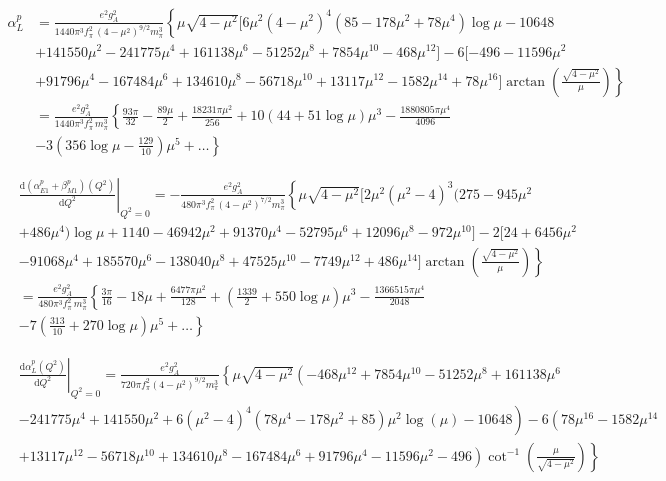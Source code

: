 \documentclass[11pt,preprint,tightenlines,
showpacs,preprintnumbers,amsmath,amssymb,superscriptaddress,a4paper,nofootinbib]{revtex4-1}
\def\dd{\mathrm{d}}
\begin{document}
\begin{align}
\alpha_{L}^p &= \frac{e^2 g_A^2}{1440 \pi^3 f_\pi^2\,  (4-\mu^2)^{9/2} m_\pi^3}\left\{   \mu  \sqrt{4-\mu^2} [ 6 \mu^2 (4-\mu^2)^4 (85 - 178 \mu^2 + 78 \mu^4) \log\mu -10648  \nonumber \right.\\
&+ 141550 \mu^2- 241775 \mu^4 + 161138 \mu^6 -51252 \mu^8 + 7854 \mu^{10} -468 \mu^{12}  ]  - 6 [-496 - 11596  \mu^2  \nonumber \\
&\left.+ 91796 \mu^4 -167484 \mu^6 + 134610 \mu^8 - 56718 \mu^{10} + 13117 \mu^{12} - 1582 \mu^{14} + 78 \mu^{16}] \arctan\left( \frac{\sqrt{4-\mu^2}}{\mu}\right) \right\}\nonumber\\
&= \frac{e^2 g_A^2}{1440 \pi^3 f_\pi^2\,  m_\pi^3}\left\{ \frac{93 \pi}{32} - \frac{89 \mu}{2} + \frac{18231 \pi \mu^2}{256} +10 (44+ 51 \log\mu )\mu^3 -\frac{1880805 \pi \mu^4}{4096} \right.\nonumber \\
&\left. - 3\left(356 \log\mu -\frac{129}{10}\right)\mu^5 +\dots  \right\}
\end{align}


\begin{align}
&\left.\frac{\dd(\alpha_{E1}^p+\beta_{M1}^p) (Q^2)}{\dd Q^2}\right|_{Q^2=0}=-\frac{e^2 g_A^2}{480 \pi^3 f_\pi^2\,  (4-\mu^2)^{7/2} m_\pi^3}\left\{ \mu\sqrt{4-\mu^2} [2\mu^2 (\mu^2-4)^3 (275-945 \mu^2  \right. \nonumber \\
&+486 \mu^4) \log\mu + 1140-46942 \mu^2 + 91370 \mu^4-52795 \mu^6 +12096 \mu^8 -972 \mu^{10} ]  -2 [24 +6456\mu^2 \nonumber\\
&\left. -91068 \mu^4 +185570 \mu^6 - 138040 \mu^8 +47525\mu^{10} -7749\mu^{12} +486 \mu^{14}] \arctan\left( \frac{\sqrt{4-\mu^2}}{\mu}\right) \right\} \nonumber \\
&= \frac{e^2 g_A^2}{480 \pi^3 f_\pi^2\,  m_\pi^3} \left\{  \frac{3 \pi}{16} -18 \mu + \frac{6477 \pi \mu^2}{128} + \left( \frac{1339}{2} + 550 \log\mu\right)\mu^3 -\frac{1366515 \pi \mu^4}{2048}\right. \nonumber \\ 
& \left. -7\left( \frac{313}{10} + 270 \log\mu  \right)\mu^5 +\dots  \right\}
\end{align}


\begin{align}
&\left.\frac{\dd\alpha_{L}^p (Q^2)}{\dd Q^2}\right|_{Q^2=0}= \frac{e^2 g_A^2}{720 \pi f_\pi^2 (4-\mu^2)^{9/2} m_\pi^3}\left\{\mu  \sqrt{4-\mu ^2} \left(-468 \mu ^{12}+7854 \mu ^{10}-51252 \mu ^8 + 161138 \mu ^6  \right. \right. \nonumber\\
&\left. - 241775 \mu ^4 +141550 \mu ^2+6 \left(\mu ^2-4\right)^4
   \left(78 \mu ^4-178 \mu ^2+85\right) \mu ^2 \log (\mu )-10648\right)-6 \left(78 \mu ^{16}-1582 \mu ^{14}  \right. \nonumber \\
 & \left. \left.+13117 \mu ^{12}-56718 \mu
   ^{10} +134610 \mu ^8-167484 \mu ^6+91796 \mu ^4-11596 \mu ^2-496\right) \cot ^{-1}\left(\frac{\mu }{\sqrt{4-\mu ^2}}\right)\right\}
\end{align}
\end{document}
